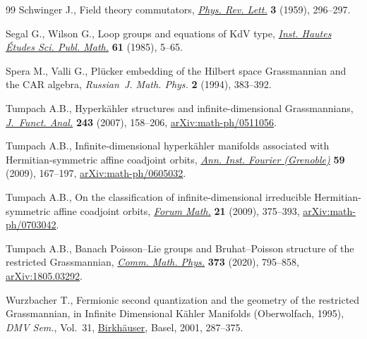 \documentclass[pdftex]{sigma}
\theoremstyle{definition}
\numberwithin{equation}{section}
\begin{document}
\begin{thebibliography}{99}
Schwinger J., Field theory commutators, \href{https://doi.org/10.1103/PhysRevLett.3.296}{\textit{Phys. Rev. Lett.}} \textbf{3}
 (1959), 296--297.

Segal G., Wilson G., Loop groups and equations of {K}d{V} type, \href{https://doi.org/10.1007/BF02698802}{\textit{Inst.
 Hautes \'Etudes Sci. Publ. Math.}} \textbf{61} (1985), 5--65.

Spera M., Valli G., Pl\"ucker embedding of the {H}ilbert space {G}rassmannian
 and the {CAR} algebra, \textit{Russian~J. Math. Phys.} \textbf{2} (1994),
 383--392.

Tumpach A.B., Hyperk\"ahler structures and infinite-dimensional
 {G}rassmannians, \href{https://doi.org/10.1016/j.jfa.2006.05.019}{\textit{J.~Funct. Anal.}} \textbf{243} (2007), 158--206,
 \href{https://arxiv.org/abs/math-ph/0511056}{arXiv:math-ph/0511056}.

Tumpach A.B., Infinite-dimensional hyperk\"ahler manifolds associated with
 {H}ermitian-symmetric affine coadjoint orbits, \href{https://doi.org/10.5802/aif.2428}{\textit{Ann. Inst. Fourier
 (Grenoble)}} \textbf{59} (2009), 167--197, \href{https://arxiv.org/abs/math-ph/0605032}{arXiv:math-ph/0605032}.

Tumpach A.B., On the classification of infinite-dimensional irreducible
 {H}ermitian-symmetric affine coadjoint orbits, \href{https://doi.org/10.1515/FORUM.2009.018}{\textit{Forum Math.}}
 \textbf{21} (2009), 375--393, \href{https://arxiv.org/abs/math-ph/0703042}{arXiv:math-ph/0703042}.

Tumpach A.B., Banach {P}oisson--{L}ie groups and {B}ruhat--{P}oisson structure
 of the restricted {G}rassmannian, \href{https://doi.org/10.1007/s00220-019-03674-3}{\textit{Comm. Math. Phys.}} \textbf{373}
 (2020), 795--858, \href{https://arxiv.org/abs/1805.03292}{arXiv:1805.03292}.

Wurzbacher T., Fermionic second quantization and the geometry of the restricted
 {G}rassmannian, in Infinite {D}imensional {K}\"ahler {M}anifolds
 ({O}berwolfach, 1995), \textit{DMV Sem.}, Vol.~31, \href{https://doi.org/10.1007/978-3-0348-8227-9_6}{Birkh\"auser}, Basel, 2001,
 287--375.

\end{thebibliography}\LastPageEnding
\end{document}
